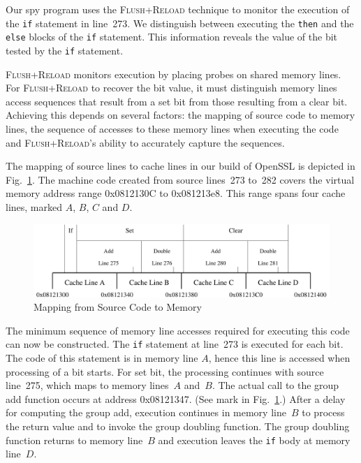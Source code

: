 \documentclass{llncs}
\begin{document}
Our spy program uses the \textsc{Flush+Reload} technique to monitor the execution of the \texttt{if}
statement in line~273.
We distinguish between executing the \texttt{then} and the \texttt{else} blocks of the \texttt{if}
statement.
This information reveals the value of the bit tested by the \texttt{if} statement.

\textsc{Flush+Reload} monitors execution by placing probes on shared memory lines.
For \textsc{Flush+Reload} to recover the bit value, it must distinguish memory lines access sequences
that result from a set bit from those resulting from a clear bit.
Achieving this depends on several factors: the mapping of source code to memory lines, 
the sequence of accesses to these memory lines when executing the code and 
\textsc{Flush+Reload}'s ability to accurately capture the sequences.


The mapping of source lines to cache lines in our build of OpenSSL is depicted in Fig.~\ref{dgm:memory}.
The machine code created from source lines~273 to~282 covers the virtual memory address range 0x0812130C
to 0x081213e8.
This range spans four cache lines, marked $A$, $B$, $C$ and $D$.


\begin{figure}[htb]
\centering\includegraphics[width=\columnwidth]{images/memory}
\caption{Mapping from Source Code to Memory\label{dgm:memory}}
\end{figure}


The minimum sequence of memory line accesses required for executing this code can now be constructed.
The \texttt{if} statement at line~273 is executed for each bit.  
The code of this statement is in memory line $A$, hence this line is accessed when processing of a bit starts.
For set bit, the processing continues with source line~275, which maps to memory lines~$A$ and~$B$.
The actual call to the group add function occurs at address 0x08121347.
(See mark in Fig.~\ref{dgm:memory}.)
After a delay for computing the group add, execution continues in memory line~$B$ to process the return value and 
to invoke the group doubling function.
The group doubling function returns to memory line~$B$ and execution leaves the \texttt{if} body at memory line~$D$.
\end{document}
